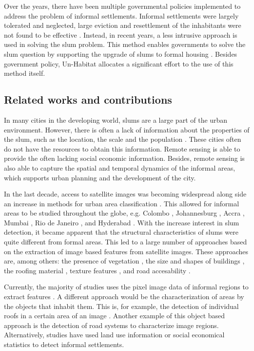 Over the years, there have been multiple governmental policies implemented to address the problem of informal settlements. Informal settlements were largely tolerated and neglected, large eviction and resettlement of the inhabitants were not found to be effective \cite{kuffer2016slums}. Instead, in recent years, a less intrusive approach is used in solving the slum problem. This method enables governments to solve the slum question by supporting the upgrade of slums to formal housing \cite{cobbett2013cities}. Besides government policy, Un-Habitat allocates a significant effort to the use of this method itself\cite{2015globact}.

\subsection{Related works and contributions}
In many cities in the developing world, slums are a large part of the urban environment. However, there is often a lack of information about the properties of the slum, such as the location, the scale and the population \cite{kuffer2016slums}. These cities often do not have the resources to obtain this information. Remote sensing is able to provide the often lacking  social economic information. Besides, remote sensing is also able to capture the spatial and temporal dynamics of the informal areas, which supports urban planning and the development of the city.

In the last decade, access to satellite images was becoming widespread along side an increase in methods for urban area classification \cite{kuffer2016slums}. This allowed for informal areas to be studied throughout the globe, e.g. Colombo \cite{colombo}, Johannesburg \cite{williams2016automatic}, Accra \cite{accra}, Mumbai \cite{mumbai}, Rio de Janeiro \cite{hofmann2008detecting}, and Hyderabad \cite{hyderabad}. With the increase interest in slum detection, it became apparent that the structural characteristics of slums were quite different from formal areas. This led to a large number of approaches based on the extraction of  image based features from satellite images. These approaches are, among others: the presence of vegetation \cite{niebergall2007object}, the size and shapes of buildings \cite{hofmann2008detecting}, the roofing material \cite{williams2016automatic}, texture features \cite{mattia2007exploiting}, and road accesability \cite{owen2013approach}.

Currently, the majority of studies uses the pixel image data of informal regions to extract features \cite{kuffer2016slums}. A different approach would be the characterization of areas by the objects that inhabit them. This is, for example, the detection of individual roofs in a certain area  of an image \cite{williams2016automatic}. Another example of this object based approach is the detection of road systems to characterize image regions. Alternatively, studies have used land use information \cite{novack2010urban} or social economical statistics \cite{engstrom2011using} to detect informal settlements.

